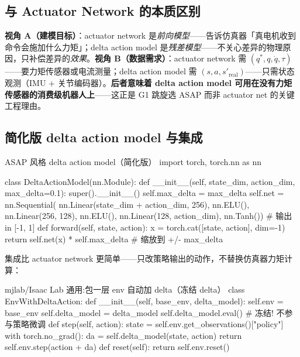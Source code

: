 \subsection{与 Actuator Network 的本质区别}
\label{sec:rlmc-act-delta-vs-net}

\begin{insight}\label{ins:rlmc-act-delta-dual}
\textbf{视角 A（建模目标）}：actuator network 是\emph{前向模型}——告诉仿真器「真电机收到命令会施加什么力矩」；delta action model 是\emph{残差模型}——不关心差异的物理原因，只补偿差异的\emph{效果}。\textbf{视角 B（数据需求）}：actuator network 需 $(q^*,q,\dot q,\tau)$——要力矩传感器或电流测量；delta action model 需 $(s,a,s'_{\text{real}})$——只需状态观测（IMU $+$ 关节编码器）。\textbf{后者意味着 delta action model 可用在没有力矩传感器的消费级机器人上}——这正是 G1 跳旋选 ASAP 而非 actuator net 的关键工程理由。
\end{insight}

\subsection{简化版 delta action model 与集成}
\label{sec:rlmc-act-delta-impl}

\begin{codebox}[Python]{ASAP 风格 delta action model（简化版）}
import torch, torch.nn as nn

class DeltaActionModel(nn.Module):
    def __init__(self, state_dim, action_dim, max_delta=0.1):
        super().__init__()
        self.max_delta = max_delta
        self.net = nn.Sequential(
            nn.Linear(state_dim + action_dim, 256), nn.ELU(),
            nn.Linear(256, 128), nn.ELU(),
            nn.Linear(128, action_dim), nn.Tanh())   # 输出 in [-1, 1]
    def forward(self, state, action):
        x = torch.cat([state, action], dim=-1)
        return self.net(x) * self.max_delta          # 缩放到 +/- max_delta
\end{codebox}

集成比 actuator network 更简单——只改策略输出的动作，不替换仿真器力矩计算：

\begin{codebox}[Python]{mjlab/Isaac Lab 通用:包一层 env 自动加 delta（冻结 delta）}
class EnvWithDeltaAction:
    def __init__(self, base_env, delta_model):
        self.env = base_env
        self.delta_model = delta_model
        self.delta_model.eval()                       # 冻结! 不参与策略微调
    def step(self, action):
        state = self.env.get_observations()["policy"]
        with torch.no_grad():
            da = self.delta_model(state, action)
        return self.env.step(action + da)
    def reset(self):
        return self.env.reset()
\end{codebox}

